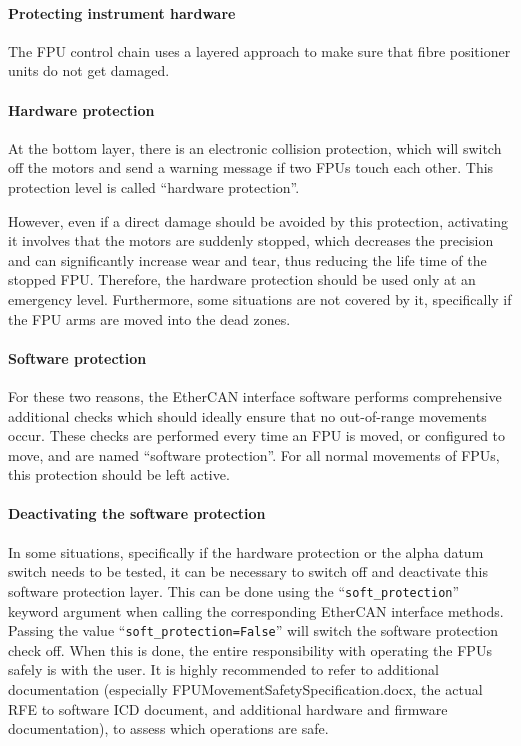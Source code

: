 \documentclass[fontsize=12,a4paper]{scrreprt}
\begin{document}
\paragraph{Protecting instrument hardware}
The FPU control chain uses a layered approach to make sure that fibre
positioner units do not get damaged.

\paragraph{Hardware protection}
At the bottom layer, there is an electronic collision protection,
which will switch off the motors and send a warning message if two
FPUs touch each other. This protection level is called ``hardware
protection''.

 

However, even if a direct damage should be avoided by this protection,
activating it involves that the motors are suddenly stopped, which
decreases the precision and can significantly increase wear and tear,
thus reducing the life time of the stopped FPU. Therefore, the
hardware protection should be used only at an emergency
level. Furthermore, some situations are not covered by it,
specifically if the FPU arms are moved into the dead zones.

\paragraph{Software protection}
For these two reasons, the EtherCAN interface software performs
comprehensive additional checks which should ideally ensure that no
out-of-range movements occur. These checks are performed every time an
FPU is moved, or configured to move, and are named ``software
protection''.  For all normal movements of FPUs, this protection
should be left active.

\paragraph{Deactivating the software protection}
In some situations, specifically if the hardware protection or the
alpha datum switch needs to be tested, it can be necessary to switch
off and deactivate this software protection layer. This can be done
using the ``\texttt{soft\_protection}'' keyword argument when calling
the corresponding EtherCAN interface methods. Passing the value
``\texttt{soft\_protection=False}'' will switch the software
protection check off. When this is done, the entire responsibility
with operating the FPUs safely is with the user. It is highly
recommended to refer to additional documentation (especially
FPUMovementSafetySpecification.docx, the actual RFE to software ICD
document, and additional hardware and firmware documentation), to
assess which operations are safe.
\end{document}
